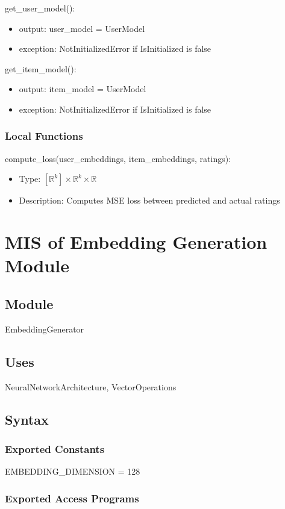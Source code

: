 \documentclass[12pt, titlepage]{article}
\begin{document}
\noindent get\_user\_model():
\begin{itemize}
\item output: user\_model = UserModel
\item exception: NotInitializedError if IsInitialized is false
\end{itemize}
\noindent get\_item\_model():
\begin{itemize}
\item output: item\_model = UserModel
\item exception: NotInitializedError if IsInitialized is false
\end{itemize}

\subsubsection{Local Functions}
compute\_loss(user\_embeddings, item\_embeddings, ratings):
\begin{itemize}
  \item Type: $[\mathbb{R}^k]\times\mathbb{R}^k\times \mathbb{R}$
  \item Description: Computes MSE loss between predicted and actual ratings
\end{itemize}

\section{MIS of Embedding Generation Module} \label{ModuleEG}

\subsection{Module}

EmbeddingGenerator

\subsection{Uses}
NeuralNetworkArchitecture, VectorOperations

\subsection{Syntax}

\subsubsection{Exported Constants}
EMBEDDING\_DIMENSION = 128
\subsubsection{Exported Access Programs}
\end{document}

